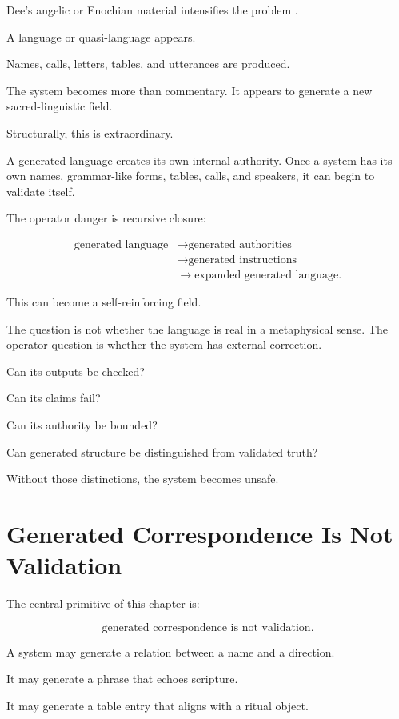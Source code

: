 \documentclass[11pt]{book}
\begin{document}
Dee’s angelic or Enochian material intensifies the problem \cite{DeeCasaubon1659TrueFaithfulRelation,Yates1964GiordanoBruno}.

A language or quasi-language appears.

Names, calls, letters, tables, and utterances are produced.

The system becomes more than commentary. It appears to generate a new sacred-linguistic field.

Structurally, this is extraordinary.

A generated language creates its own internal authority. Once a system has its own names, grammar-like forms, tables, calls, and speakers, it can begin to validate itself.

The operator danger is recursive closure:

\[
\begin{aligned}
\text{generated language}
&\rightarrow
\text{generated authorities} \\
&\rightarrow
\text{generated instructions} \\
&\rightarrow
\text{expanded generated language}.
\end{aligned}
\]

This can become a self-reinforcing field.

The question is not whether the language is real in a metaphysical sense. The operator question is whether the system has external correction.

Can its outputs be checked?

Can its claims fail?

Can its authority be bounded?

Can generated structure be distinguished from validated truth?

Without those distinctions, the system becomes unsafe.

\section{Generated Correspondence Is Not Validation}

The central primitive of this chapter is:

\[
\text{generated correspondence is not validation}.
\]

A system may generate a relation between a name and a direction.

It may generate a phrase that echoes scripture.

It may generate a table entry that aligns with a ritual object.
\end{document}
